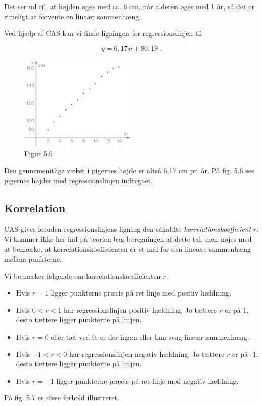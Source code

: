 \documentclass[12pt,oneside,a4paper]{article}
\begin{document}
Det ser ud til, at højden øges med ca. 6 cm, når alderen øges med 1 år, så det
er rimeligt at forvente en lineær sammenhæng.

Ved hjælp af CAS kan vi finde ligningen for regressionslinjen til

$$
y = 6,17x + 80,19 \; .
$$

\begin{figure}[ht]
    \centering
    \includegraphics[width=0.5\textwidth]{fig56}
    \caption{Figur 5.6}
    \label{fig56}
\end{figure}

Den gennemsnitlige vækst i pigernes højde er altså 6,17 cm pr. år. På fig. 5.6
ses pigernes højder med regressionslinjen indtegnet.

\subsection{Korrelation}
CAS giver foruden regressionslinjens ligning den såkaldte {\em
korrelations\-koef\-fi\-cient} $r$. Vi kommer ikke her ind på teorien bag
beregningen af dette tal, men nøjes med at bemærke, at
korrelationskoefficienten er et mål for den lineære sammenhæng mellem
punkterne.

Vi bemærker følgende om korrelationskoefficienten $r$:

\begin{itemize}
    \item Hvis $r = 1$ ligger punkterne præcis på ret linje med positiv hældning.
    \item Hvis $0 < r < 1$ har regressionslinjen positiv hældning. Jo tættere $r$
        er på 1, desto tættere ligger punkterne på linjen.
    \item Hvis $r = 0$ eller tæt ved 0, er der ingen eller kun svag lineær sammenhæng.
    \item Hvis $-1 < r < 0$ har regressionslinjen negativ hældning. Jo tættere $r$
        er på -1, desto tættere ligger punkterne på linjen.
    \item Hvis $r = -1$ ligger punkterne præcis på ret linje med negativ hældning. 
\end{itemize}
På fig. 5.7 er disse forhold illustreret.
\end{document}
